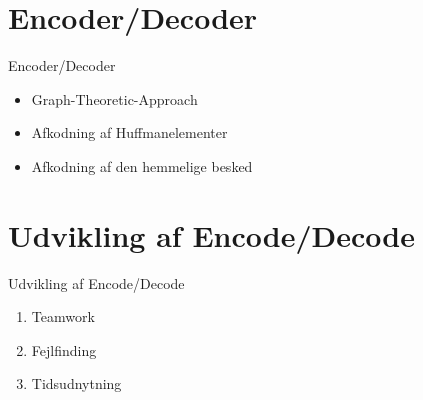 \section{Encoder/Decoder}
\begin{frame}{Encoder/Decoder}{}
	\begin{itemize}
		\item Graph-Theoretic-Approach
		\item Afkodning af Huffmanelementer
		\item Afkodning af den hemmelige besked
	\end{itemize}
\end{frame}


\section{Udvikling af Encode/Decode}
\begin{frame}{Udvikling af Encode/Decode}{}
	\begin{enumerate}
		\item Teamwork
		\item Fejlfinding
		\item Tidsudnytning
	\end{enumerate}
\end{frame}


